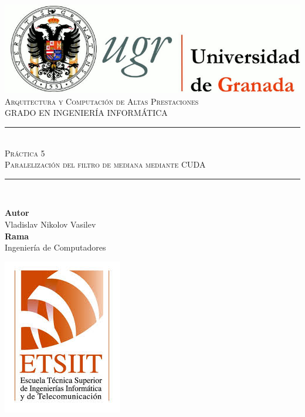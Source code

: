 \documentclass[11pt,a4paper]{article}
\newcommand{\asignatura}{Arquitectura y Computación de Altas Prestaciones}
\newcommand{\autor}{Vladislav Nikolov Vasilev}
\newcommand{\titulo}{Práctica 5}
\newcommand{\subtitulo}{Paralelización del filtro de mediana mediante CUDA}
\newcommand{\rama}{Ingeniería de Computadores}
\begin{document}

\begin{titlepage}

\begin{minipage}{\textwidth}

\centering

\includegraphics[scale=0.3]{img/logo_ugr.jpg}\\[1cm]

\textsc{\Large \asignatura{}\\[0.2cm]}
\textsc{GRADO EN INGENIERÍA INFORMÁTICA}\\[1cm]

\noindent\rule[-1ex]{\textwidth}{1pt}\\[1.5ex]
\textsc{{\Huge \titulo\\[0.5ex]}}
\textsc{{\Large \subtitulo\\}}
\noindent\rule[-1ex]{\textwidth}{2pt}\\[3.5ex]

\end{minipage}

\vspace{0.7cm}

\begin{minipage}{\textwidth}

\centering

\textbf{Autor}\\ {\autor{}}\\[2.5ex]
\textbf{Rama}\\ {\rama}\\[2.5ex]
\vspace{0.3cm}

\includegraphics[scale=0.3]{img/etsiit.jpeg}


\end{minipage}
\end{titlepage}
\end{document}

